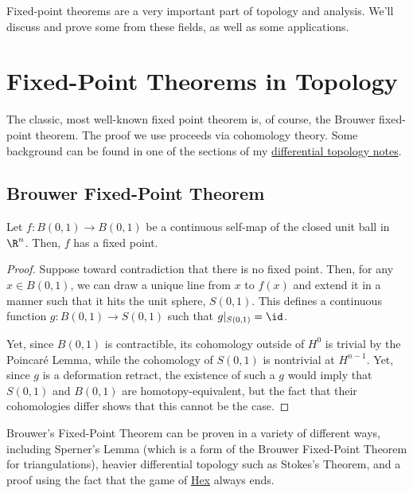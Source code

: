 \documentclass[10pt]{mypackage}
\begin{document}
\RaggedRight
Fixed-point theorems are a very important part of topology and analysis. We'll discuss and prove some from these fields, as well as some applications.
\section{Fixed-Point Theorems in Topology}%
The classic, most well-known fixed point theorem is, of course, the Brouwer fixed-point theorem. The proof we use proceeds via cohomology theory. Some background can be found in one of the sections of my \href{https://ai.avinash-iyer.com/Classes_and_Homework/After\%20College/Classes/Differential\%20Topology/differential_topology_notes.pdf}{differential topology notes}.
\subsection{Brouwer Fixed-Point Theorem}%
\begin{theorem}
  Let $f\colon B\left( 0,1 \right)\rightarrow B\left( 0,1 \right)$ be a continuous self-map of the closed unit ball in $\R^{n}$. Then, $f$ has a fixed point.
\end{theorem}
\begin{proof}
  Suppose toward contradiction that there is no fixed point. Then, for any $x\in B\left( 0,1 \right)$, we can draw a unique line from $x$ to $f(x)$ and extend it in a manner such that it hits the unit sphere, $S\left( 0,1 \right)$. This defines a continuous function $g\colon B\left( 0,1 \right)\rightarrow S\left( 0,1 \right)$ such that $g|_{S\left( 0,1 \right)} = \id$.

  Yet, since $B\left( 0,1 \right)$ is contractible, its cohomology outside of $H^{0}$ is trivial by the Poincaré Lemma, while the cohomology of $S\left( 0,1 \right)$ is nontrivial at $H^{n-1}$. Yet, since $g$ is a deformation retract, the existence of such a $g$ would imply that $S\left( 0,1 \right)$ and $B\left( 0,1 \right)$ are homotopy-equivalent, but the fact that their cohomologies differ shows that this cannot be the case.
\end{proof}
Brouwer's Fixed-Point Theorem can be proven in a variety of different ways, including Sperner's Lemma (which is a form of the Brouwer Fixed-Point Theorem for triangulations), heavier differential topology such as Stokes's Theorem, and a proof using the fact that the game of \href{https://en.wikipedia.org/wiki/Hex_(board_game)}{Hex} always ends.
\end{document}
